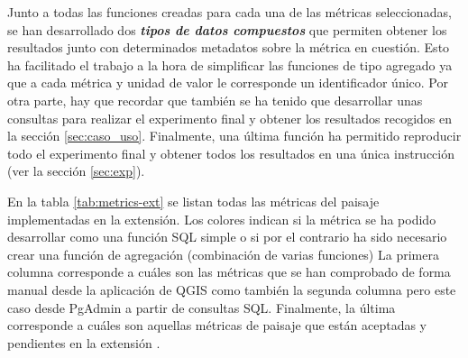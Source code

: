 Junto a todas las funciones creadas para cada una de las métricas seleccionadas, se han desarrollado dos \textbf{\textit{tipos de datos compuestos}} que permiten obtener los resultados junto con determinados metadatos sobre la métrica en cuestión. Esto ha facilitado el trabajo a la hora de simplificar las funciones de tipo agregado ya que a cada métrica y unidad de valor le corresponde un identificador único. Por otra parte, hay que recordar que también se ha tenido que desarrollar unas consultas para realizar el experimento final y obtener los resultados recogidos en la sección \ref{sec:caso_uso}. Finalmente, una última función ha permitido reproducir todo el experimento final y obtener todos los resultados en una única instrucción (ver la sección \ref{sec:exp}). 

En la tabla \ref{tab:metrics-ext} se listan todas las métricas del paisaje implementadas en la extensión. Los colores indican si la métrica se ha podido desarrollar como una función SQL simple o si por el contrario ha sido necesario crear una función de agregación (combinación de varias funciones) La primera columna corresponde a cuáles son las métricas que se han comprobado de forma manual desde la aplicación de QGIS como también la segunda columna pero este caso desde PgAdmin a partir de consultas SQL. Finalmente, la última corresponde a cuáles son aquellas métricas de paisaje que están aceptadas y pendientes en la extensión \pgland{}. 

